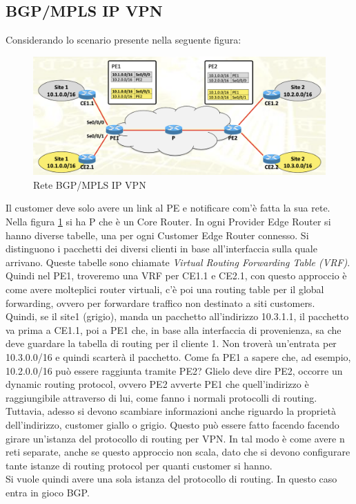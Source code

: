 \documentclass{article}
\begin{document}
\subsection{BGP/MPLS IP VPN} Considerando lo scenario presente nella seguente figura:
\begin{figure}[H]
    \centering
    \includegraphics[scale=0.5]{figures/bgp-mpls vpn.png}
    \caption{Rete BGP/MPLS IP VPN}\label{figura:bgpmpls}
\end{figure}
\noindent Il customer deve solo avere un link al PE e notificare com'è fatta la sua rete. Nella figura \ref{figura:bgpmpls} si ha P che è un Core Router. In ogni Provider Edge Router si hanno diverse tabelle, una per ogni Customer Edge Router connesso. Si distinguono i pacchetti dei diversi clienti in base all'interfaccia sulla quale arrivano. Queste tabelle sono chiamate \textit{Virtual Routing Forwarding Table (VRF)}. Quindi nel PE1, troveremo una VRF per CE1.1 e CE2.1, con questo approccio è come avere molteplici router virtuali, c'è poi una routing table per il global forwarding, ovvero per forwardare traffico non destinato a siti customers. \\ Quindi, se il site1 (grigio), manda un pacchetto all'indirizzo 10.3.1.1, il pacchetto va prima a CE1.1, poi a PE1 che, in base alla interfaccia di provenienza, sa che deve guardare la tabella di routing per il cliente 1. Non troverà un'entrata per 10.3.0.0/16 e quindi scarterà il pacchetto. Come fa PE1 a sapere che, ad esempio, 10.2.0.0/16 può essere raggiunta tramite PE2? Glielo deve dire PE2, occorre un dynamic routing protocol, ovvero PE2 avverte PE1 che quell'indirizzo è raggiungibile attraverso di lui, come fanno i normali protocolli di routing. Tuttavia, adesso si devono scambiare informazioni anche riguardo la proprietà dell'indirizzo, customer giallo o grigio. Questo può essere fatto facendo facendo girare un'istanza del protocollo di routing per VPN. In tal modo è come avere n reti separate, anche se questo approccio non scala, dato che si devono configurare tante istanze di routing protocol per quanti customer si hanno. \\ Si vuole quindi avere una sola istanza del protocollo di routing. In questo caso entra in gioco BGP. 
\end{document}
